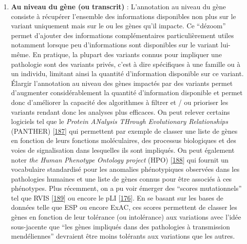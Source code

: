 \documentclass[12pt,a4paper,twoside]{ugathesis}
\providecommand{\tightlist}{%
  \setlength{\itemsep}{0pt}\setlength{\parskip}{0pt}}
\theoremstyle{definition}
\theoremstyle{definition}
\theoremstyle{definition}
\theoremstyle{remark}
\begin{document}
\newpage

\begin{enumerate}
\def\labelenumi{\arabic{enumi}.}
\setcounter{enumi}{1}
\tightlist
\item
  \textbf{Au niveau du gène (ou transcrit)} : L'annotation au niveau du
  gène consiste à récupérer l'ensemble des informations disponibles non
  plus sur le variant uniquement mais sur le ou les gènes qu'il impacte.
  Ce ``dézoom'' permet d'ajouter des informations complémentaires
  particulièrement utiles notamment lorsque peu d'informations sont
  disponibles sur le variant lui-même. En pratique, la plupart des
  variants connus pour impliquer une pathologie sont des variants
  privés, c'est à dire spécifiques à une famille ou à un individu,
  limitant ainsi la quantité d'information disponible sur ce variant.
  Élargir l'annotation au niveau des gènes impactés par des variants
  permet d'augmenter considérablement la quantité d'information
  disponible et permet donc d'améliorer la capacité des algorithmes à
  filtrer et / ou prioriser les variants rendant donc les analyses plus
  efficaces. On peut relever certains logiciels tel que le \emph{Protein
  ANalysis THrough Evolutionary Relationships} (PANTHER)
  {[}\protect\hyperlink{ref-Mi2017}{187}{]} qui permettent par exemple
  de classer une liste de gènes en fonction de leurs fonctions
  moléculaires, des processus biologiques et des voies de signalisation
  dans lesquelles ils sont impliqués. On peut également noter \emph{the
  Human Phenotype Ontology project} (HPO)
  {[}\protect\hyperlink{ref-Kohler2014}{188}{]} qui fournit un
  vocabulaire standardisé pour les anomalies phénotypiques observées
  dans les pathologies humaines et une liste de gènes connus pour être
  associés à ces phénotypes. Plus récemment, on a pu voir émerger des
  ``scores mutationnels'' tel que RVIS
  {[}\protect\hyperlink{ref-Petrovski2013}{189}{]} ou encore le pLI
  {[}\protect\hyperlink{ref-Lek2016}{176}{]}. En se basant sur les bases
  de données telle que ESP ou encore ExAC, ces scores permettent de
  classer les gènes en fonction de leur tolérance (ou intolérance) aux
  variations avec l'idée sous-jacente que ``les gènes impliqués dans des
  pathologies à transmission mendéliennes'' devraient être moins
  tolérants aux variations que les autres.
\end{enumerate}
\end{document}
